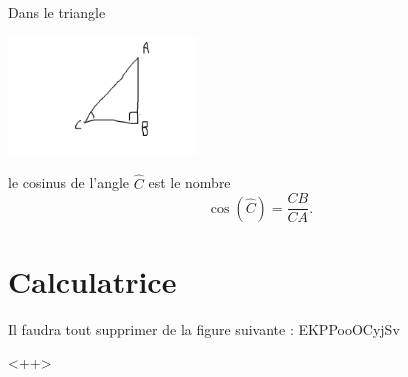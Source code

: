 \begin{example}
    Dans le triangle
    \begin{center}
        \includegraphics[width=5cm]{faux_ex_adj.pdf}
    \end{center}
    le cosinus de l'angle \( \hat C\) est le nombre
    \begin{equation}
        \cos(\hat C)=\frac{ CB }{ CA }.
    \end{equation}
\end{example}

\section{Calculatrice}

Il faudra tout supprimer de la figure suivante :
EKPPooOCyjSv

\begin{center}

\end{center}
<++>

